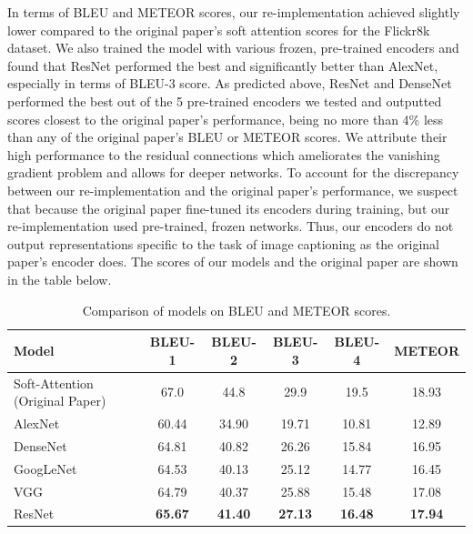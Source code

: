 \documentclass{article}
\begin{document}

In terms of BLEU and METEOR scores, our re-implementation achieved slightly lower compared to the original paper's soft attention scores for the Flickr8k dataset. We also trained the model with various frozen, pre-trained encoders and found that ResNet performed the best and significantly better than AlexNet, especially in terms of BLEU-3 score. As predicted above, ResNet and DenseNet performed the best out of the 5 pre-trained encoders we tested and outputted scores closest to the original paper's performance, being no more than 4\% less than any of the original paper's BLEU or METEOR scores. We attribute their high performance to the residual connections which ameliorates the vanishing gradient problem and allows for deeper networks. To account for the discrepancy between our re-implementation and the original paper's performance, we suspect that because the original paper fine-tuned its encoders during training, but our re-implementation used pre-trained, frozen networks. Thus, our encoders do not output representations specific to the task of image captioning as the original paper's encoder does. The scores of our models and the original paper are shown in the table below.

\begin{table}[h]
\centering
\caption{Comparison of models on BLEU and METEOR scores.}
\label{tab:mytable}
\begin{adjustbox}{width=.75\textwidth}
\small
\begin{tabular}{lccccc}
\toprule
Model & BLEU-1 & BLEU-2 & BLEU-3 & BLEU-4 & METEOR \\
\midrule
Soft-Attention (Original Paper) & 67.0 & 44.8 & 29.9 & 19.5 & 18.93 \\
AlexNet                & 60.44 & 34.90 & 19.71 & 10.81 & 12.89 \\
DenseNet               & 64.81 & 40.82 & 26.26 & 15.84 & 16.95 \\
GoogLeNet              & 64.53 & 40.13 & 25.12 & 14.77 & 16.45 \\
VGG                    & 64.79 & 40.37 & 25.88 & 15.48 & 17.08 \\
ResNet                 & \textbf{65.67} & \textbf{41.40} & \textbf{27.13} & \textbf{16.48} & \textbf{17.94} \\
\bottomrule
\end{tabular}
\end{adjustbox}
\end{table}
\end{document}
